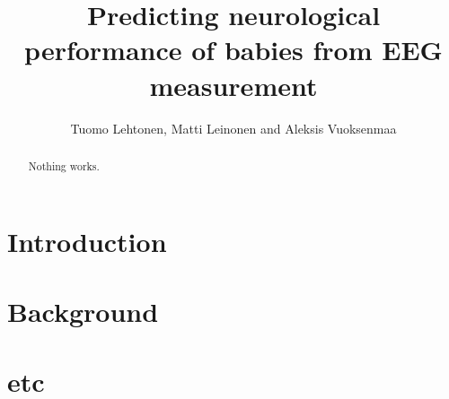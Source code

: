 \documentclass[10pt]{article}
\title{Predicting neurological performance of babies from EEG measurement}
\author{Tuomo Lehtonen, Matti Leinonen and Aleksis Vuoksenmaa}
\begin{document}
\maketitle

\begin{abstract}
Nothing works.
\end{abstract}

\section{Introduction}

\section{Background}

\section{etc}



\end{document}
